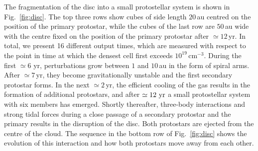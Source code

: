 \documentclass[useAMS,usenatbib]{mnras}
\newcommand{\cmmm}{\text{cm}^{-3}}
\begin{document}
The fragmentation of the disc into a small protostellar system is shown in Fig.~\ref{fig:disc}. The top three rows show cubes of side length $20\,$au centred on the position of the primary protostar, while the cubes of the last row are $50\,$au wide with the centre fixed on the position of the primary protostar after $\simeq 12\,$yr. In total, we present 16 different output times, which are measured with respect to the point in time at which the densest cell first exceeds $10^{19}\,\cmmm$. During the first $\simeq 6$ yr, perturbations grow between $1$ and $10\,$au in the form of spiral arms. After $\simeq 7\,$yr, they become gravitationally unstable and the first secondary protostar forms. In the next $\simeq 2\,$yr, the efficient cooling of the gas results in the formation of additional protostars, and after $\simeq 12~{\rm yr}$ a small protostellar system with six members has emerged. Shortly thereafter, three-body interactions and strong tidal forces during a close passage of a secondary protostar and the primary results in the disruption of the disc. Both protostars are ejected from the centre of the cloud. The sequence in the bottom row of Fig.~\ref{fig:disc} shows the evolution of this interaction and how both protostars move away from each other.
\end{document}
